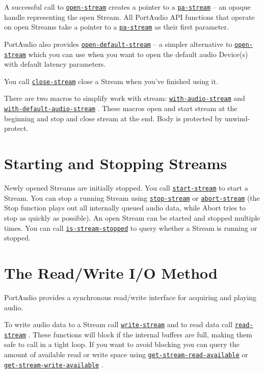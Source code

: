 \documentclass[a4paper]{report}
\begin{document}
A successful call to \hyperref[portaudio__fun__open-stream]{\texttt{open-stream}}
   creates a pointer to a \hyperref[portaudio__class__pa-stream]{\texttt{pa-stream}}
   – an opaque handle representing the open Stream. All PortAudio API functions that operate on open Streams take a pointer to a \hyperref[portaudio__class__pa-stream]{\texttt{pa-stream}}
   as their first parameter.

PortAudio also provides \hyperref[portaudio__fun__open-default-stream]{\texttt{open-default-stream}}
   – a simpler alternative to \hyperref[portaudio__fun__open-stream]{\texttt{open-stream}}
   which you can use when you want to open the default audio Device(s) with default latency parameters.

You call \hyperref[portaudio__fun__close-stream]{\texttt{close-stream}}
   close a Stream when you've finished using it.

There are two macros to simplify work with stream: \hyperref[portaudio__fun__with-audio-stream]{\texttt{with-audio-stream}}
   and \hyperref[portaudio__fun__with-default-audio-stream]{\texttt{with-default-audio-stream}}
  . These macros open and start stream at the beginning and stop and close stream at the end. Body is protected by unwind-protect.\section{Starting and Stopping Streams} \label{d0d0e0e0e0e9}Newly opened Streams are initially stopped. You call \hyperref[portaudio__fun__start-stream]{\texttt{start-stream}}
   to start a Stream. You can stop a running Stream using \hyperref[portaudio__fun__stop-stream]{\texttt{stop-stream}}
   or \hyperref[portaudio__fun__abort-stream]{\texttt{abort-stream}}
   (the Stop function plays out all internally queued audio data, while Abort tries to stop as quickly as possible). An open Stream can be started and stopped multiple times. You can call \hyperref[portaudio__fun__is-stream-stopped]{\texttt{is-stream-stopped}}
   to query whether a Stream is running or stopped.\section{The Read/Write I/O Method} \label{d0d0e0e0e0e10}
PortAudio provides a synchronous read/write interface for acquiring and playing audio.

To write audio data to a Stream call \hyperref[portaudio__fun__write-stream]{\texttt{write-stream}}
   and to read data call \hyperref[portaudio__fun__read-stream]{\texttt{read-stream}}
  . These functions will block if the internal buffers are full, making them safe to call in a tight loop. If you want to avoid blocking you can query the amount of available read or write space using \hyperref[portaudio__fun__get-stream-read-available]{\texttt{get-stream-read-available}}
   or \hyperref[portaudio__fun__get-stream-write-available]{\texttt{get-stream-write-available}}
  .
\end{document}
